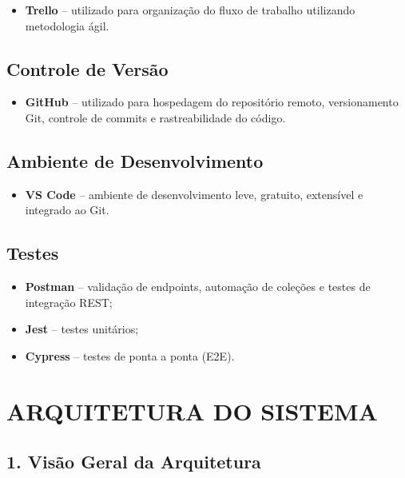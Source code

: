 \documentclass[12pt,a4paper]{article}
\begin{document}
\begin{itemize}
    \item \textbf{Trello} -- utilizado para organização do fluxo de
    trabalho utilizando metodologia ágil.
\end{itemize}

\subsection*{Controle de Versão}

\begin{itemize}
    \item \textbf{GitHub} -- utilizado para hospedagem do repositório
    remoto, versionamento Git, controle de commits e rastreabilidade
    do código.
\end{itemize}

\subsection*{Ambiente de Desenvolvimento}

\begin{itemize}
    \item \textbf{VS Code} -- ambiente de desenvolvimento leve,
    gratuito, extensível e integrado ao Git.
\end{itemize}

\subsection*{Testes}

\begin{itemize}
    \item \textbf{Postman} -- validação de endpoints, automação de
    coleções e testes de integração REST;
    \item \textbf{Jest} -- testes unitários;
    \item \textbf{Cypress} -- testes de ponta a ponta (E2E).
\end{itemize}


\section*{ARQUITETURA DO SISTEMA}

\subsection*{1. Visão Geral da Arquitetura}
\end{document}
